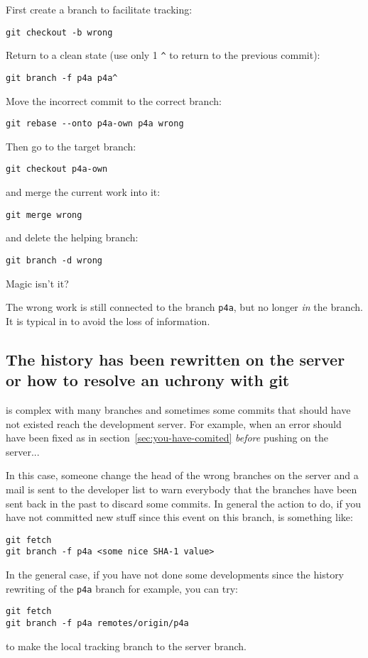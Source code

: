 \documentclass[a4paper]{article}
\begin{document}
First create a branch to facilitate tracking:
\begin{verbatim}
git checkout -b wrong
\end{verbatim}
Return to a clean state (use only 1 \verb|^| to return to the previous
commit):
\begin{verbatim}
git branch -f p4a p4a^
\end{verbatim}
Move the incorrect commit to the correct branch:
\begin{verbatim}
git rebase --onto p4a-own p4a wrong
\end{verbatim}
Then go to the target branch:
\begin{verbatim}
git checkout p4a-own
\end{verbatim}
and merge the current work into it:
\begin{verbatim}
git merge wrong
\end{verbatim}
and delete the helping branch:
\begin{verbatim}
git branch -d wrong
\end{verbatim}
Magic isn't it? \smiley

The wrong work is still connected to the branch
\texttt{p4a}, but no longer \emph{in} the branch. It is typical in
\Agit to avoid the loss
of information.


\subsection{The history has been rewritten on the server or how to resolve
  an uchrony with git}
\label{sec:history-has-been}

\Apfa is complex with many branches and sometimes some commits that should
have not existed reach the development server. For example, when an error
should have been fixed as in section~\ref{sec:you-have-comited}
\emph{before} pushing on the server...

In this case, someone change the head of the wrong branches on the server
and a mail is sent to the developer list to warn everybody that the
branches have been sent back in the past to discard some commits. In
general the action to do, if you have not committed new stuff since this
event on this branch, is something like:
\begin{verbatim}
git fetch
git branch -f p4a <some nice SHA-1 value>
\end{verbatim}

In the general case, if you have not done some developments since the
history rewriting of the \texttt{p4a} branch for example, you can try:
\begin{verbatim}
git fetch
git branch -f p4a remotes/origin/p4a
\end{verbatim}
to make the local tracking branch to the server branch.
\end{document}
